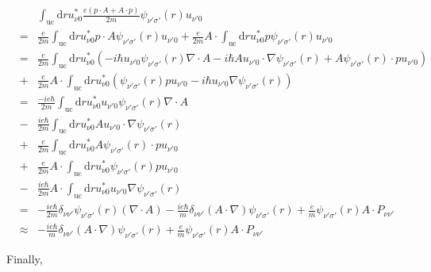 \documentclass{article}
\begin{document}
\begin{eqnarray*}  &  & \int_{\text{uc}} \text{d} r u^{\ast}_{\nu 0} \frac{e (p \cdot A + A  \cdot p)}{2 m} \psi_{\nu' \sigma'} (r) u_{\nu' 0}\\  & = & \frac{e}{2 m} \int_{\text{uc}} \text{d} r u^{\ast}_{\nu 0} p \cdot A  \psi_{\nu' \sigma'} (r) u_{\nu' 0} + \frac{e}{2 m} A \cdot \int_{\text{uc}}  \text{d} r u^{\ast}_{\nu 0} p \psi_{\nu' \sigma'} (r) u_{\nu' 0}\\  & = & \frac{e}{2 m} \int_{\text{uc}} \text{d} r u^{\ast}_{\nu 0} (- i \hbar  u_{\nu' 0} \psi_{\nu' \sigma'} (r) \nabla \cdot A - i \hbar A u_{\nu' 0}  \cdot \nabla \psi_{\nu' \sigma'} (r) + A \psi_{\nu' \sigma'} (r) \cdot p  u_{\nu' 0})\\  & + & \frac{e}{2 m} A \cdot \int_{\text{uc}} \text{d} r u^{\ast}_{\nu 0}  (\psi_{\nu' \sigma'} (r) p u_{\nu' 0} - i \hbar u_{\nu' 0} \nabla \psi_{\nu'  \sigma'} (r))\\  & = & \frac{- i e \hbar}{2 m} \int_{\text{uc}} \text{d} r u^{\ast}_{\nu 0}  u_{\nu' 0} \psi_{\nu' \sigma'} (r) \nabla \cdot A\\  & - & \frac{i e \hbar}{2 m} \int_{\text{uc}} \text{d} r u^{\ast}_{\nu 0} A  u_{\nu' 0} \cdot \nabla \psi_{\nu' \sigma'} (r)\\  & + & \frac{e}{2 m} \int_{\text{uc}} \text{d} r u^{\ast}_{\nu 0} A  \psi_{\nu' \sigma'} (r) \cdot p u_{\nu' 0}\\  & + & \frac{e}{2 m} A \cdot \int_{\text{uc}} \text{d} r u^{\ast}_{\nu 0}  \psi_{\nu' \sigma'} (r) p u_{\nu' 0}\\  & - & \frac{i e \hbar}{2 m} A \cdot \int_{\text{uc}} \text{d} r  u^{\ast}_{\nu 0} u_{\nu' 0} \nabla \psi_{\nu' \sigma'} (r)\\  & = & - \frac{i e \hbar}{2 m} \delta_{\nu \nu'} \psi_{\nu' \sigma'} (r)  (\nabla \cdot A) - \frac{i e \hbar}{m} \delta_{\nu \nu'} (A \cdot \nabla)  \psi_{\nu' \sigma'} (r) + \frac{e}{m} \psi_{\nu' \sigma'} (r) A \cdot P_{\nu  \nu'}\\  & \approx & - \frac{i e \hbar}{m} \delta_{\nu \nu'} (A \cdot \nabla)  \psi_{\nu' \sigma'} (r) + \frac{e}{m} \psi_{\nu' \sigma'} (r) A \cdot P_{\nu  \nu'}\end{eqnarray*}

Finally,
\end{document}
